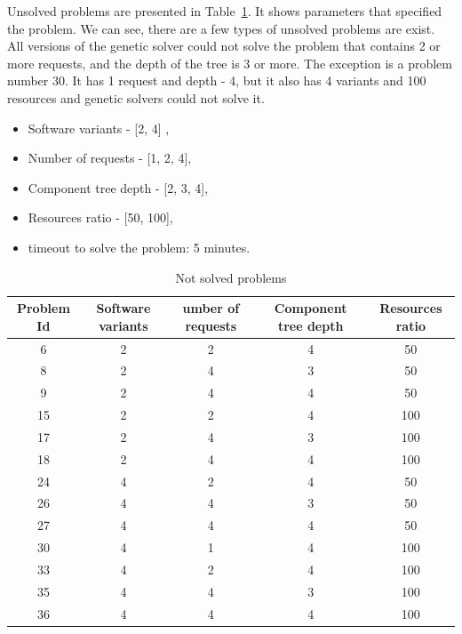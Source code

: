 Unsolved problems are presented in Table~\ref{tab:UnsolvedProblems}. It shows parameters that specified the problem. We can see, there are a few types of unsolved problems are exist. All versions of the genetic solver could not solve the problem that contains 2 or more requests, and the depth of the tree is 3 or more. The exception is a problem number 30. It has 1 request and depth - 4, but it also has 4 variants and 100 resources and genetic solvers could not solve it.

\begin{itemize}
	\item Software variants - [2, 4] ,
	\item Number of requests - [1, 2, 4],
	\item Component tree depth - [2, 3, 4],
	\item Resources ratio - [50, 100],
	\item timeout to solve the problem: 5 minutes.
\end{itemize}

\begin{table}
	\centering
	\caption{Not solved problems}\label{tab:UnsolvedProblems}
		\begin{tabular}{c c c c c}
			\hline
			Problem Id & Software variants & umber of requests & Component tree depth & Resources ratio \\
			\hline            
			6 & 2 & 2 & 4 & 50 \\
			8 & 2 & 4 & 3 & 50 \\
			9 & 2 & 4 & 4 & 50 \\
			15 & 2 & 2 & 4 & 100 \\
			17 & 2 & 4 & 3 & 100 \\
			18 & 2 & 4 & 4 & 100 \\
			24 & 4 & 2 & 4 & 50 \\
			26 & 4 & 4 & 3 & 50 \\
			27 & 4 & 4 & 4 & 50 \\
			30 & 4 & 1 & 4 & 100 \\
			33 & 4 & 2 & 4 & 100 \\
			35 & 4 & 4 & 3 & 100 \\
			36 & 4 & 4 & 4 & 100 \\
			\hline
		\end{tabular}
\end{table}

